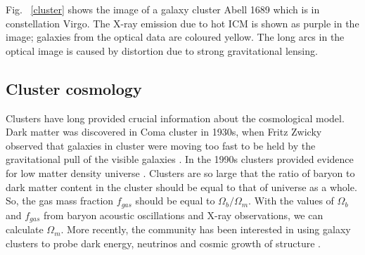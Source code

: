 Fig. ~\ref{cluster} shows the image of a galaxy cluster Abell 1689 which is in constellation Virgo. The X-ray emission due to hot ICM is shown as purple in the image; galaxies from the optical data are coloured yellow. The long arcs in the optical image is caused by distortion due to strong gravitational lensing. \\

\subsection{Cluster cosmology}
Clusters have long provided crucial information about the cosmological model. Dark matter was discovered in Coma cluster in 1930s, when Fritz Zwicky observed that galaxies in cluster were moving too fast to be held by the gravitational pull of the visible galaxies \citep{zwicky33}. In the 1990s clusters provided evidence for low matter density universe \citep{white93a}. Clusters are so large that the ratio of baryon to dark matter content in the cluster should be equal to that of universe as a whole. So, the gas mass fraction $f_{gas}$ should be equal to  $\Omega_{b} /\Omega_{m}$.
 With the values of $\Omega_{b}$ and $f_{gas}$ from baryon acoustic oscillations and X-ray observations, we can calculate $\Omega_{m}$. 
More recently, the community has been interested in using galaxy clusters to probe dark energy, neutrinos and cosmic growth of structure \citep{allen11,mantz08,mantz10a,mantz15,dehaan16,bocquet18,rozo10,vikhlinin09,salvati17,zubeldia19}.


